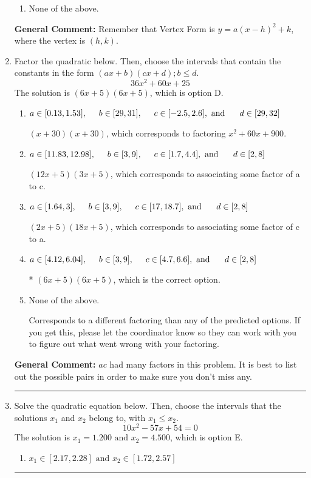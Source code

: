 \documentclass{extbook}[14pt]
\newcommand{\litem}[1]{\item #1

\rule{\textwidth}{0.4pt}}
\begin{document}
\begin{enumerate}
{\begin{enumerate}[label=\Alph*.]
\begin{multicols}{2}
\end{multicols}\item None of the above.\end{enumerate}
\textbf{General Comment:} Remember that Vertex Form is $y = a(x-h)^2+k$, where the vertex is $(h, k)$.
}
\litem{
Factor the quadratic below. Then, choose the intervals that contain the constants in the form $(ax+b)(cx+d); b \leq d.$
\[ 36x^{2} +60 x + 25 \]
The solution is \( (6x + 5)(6x + 5) \), which is option D.\begin{enumerate}[label=\Alph*.]
\item \( a \in [0.13, 1.53], \hspace*{5mm} b \in [29, 31], \hspace*{5mm} c \in [-2.5, 2.6], \text{ and } \hspace*{5mm} d \in [29, 32] \)

 $(x + 30)(x + 30)$, which corresponds to factoring $x^{2} +60 x + 900$.
\item \( a \in [11.83, 12.98], \hspace*{5mm} b \in [3, 9], \hspace*{5mm} c \in [1.7, 4.4], \text{ and } \hspace*{5mm} d \in [2, 8] \)

 $(12x + 5)(3x + 5)$, which corresponds to associating some factor of a to c.
\item \( a \in [1.64, 3], \hspace*{5mm} b \in [3, 9], \hspace*{5mm} c \in [17, 18.7], \text{ and } \hspace*{5mm} d \in [2, 8] \)

 $(2x + 5)(18x + 5)$, which corresponds to associating some factor of c to a.
\item \( a \in [4.12, 6.04], \hspace*{5mm} b \in [3, 9], \hspace*{5mm} c \in [4.7, 6.6], \text{ and } \hspace*{5mm} d \in [2, 8] \)

* $(6x + 5)(6x + 5)$, which is the correct option.
\item \( \text{None of the above.} \)

 Corresponds to a different factoring than any of the predicted options. If you get this, please let the coordinator know so they can work with you to figure out what went wrong with your factoring.
\end{enumerate}

\textbf{General Comment:} $ac$ had many factors in this problem. It is best to list out the possible pairs in order to make sure you don't miss any.
}
\litem{
Solve the quadratic equation below. Then, choose the intervals that the solutions $x_1$ and $x_2$ belong to, with $x_1 \leq x_2$.
\[ 10x^{2} -57 x + 54 = 0 \]
The solution is \( x_1 = 1.200 \text{ and } x_2 = 4.500 \), which is option E.\begin{enumerate}[label=\Alph*.]
\item \( x_1 \in [2.17, 2.28] \text{ and } x_2 \in [1.72, 2.57] \)


\end{enumerate}}
\end{enumerate}
\end{document}
